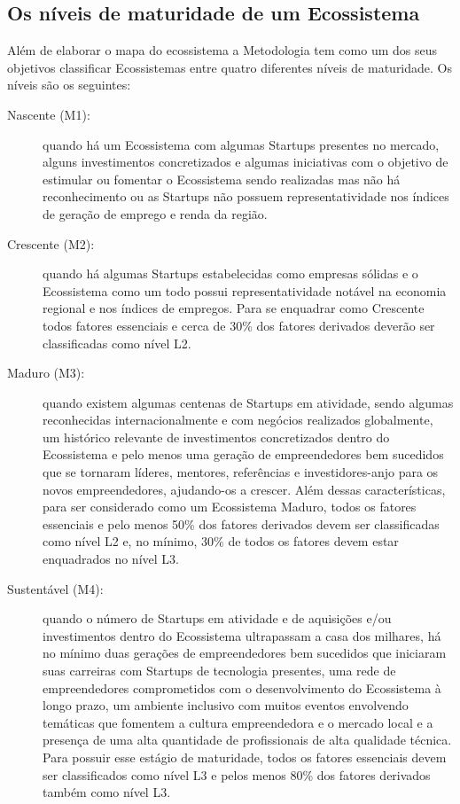 \subsection{Os níveis de maturidade de um Ecossistema}
\label{subsection:niveis_de_maturidade_de_um_ecossistema}

Além de elaborar o mapa do ecossistema a Metodologia tem como um dos seus objetivos classificar Ecossistemas entre quatro diferentes níveis de maturidade. Os níveis são os seguintes:

\begin{description}
  \item [Nascente (M1):] quando há um Ecossistema com algumas Startups presentes no mercado, alguns investimentos concretizados e algumas iniciativas com o objetivo de estimular ou fomentar o Ecossistema sendo realizadas mas não há reconhecimento ou as Startups não possuem representatividade nos índices de geração de emprego e renda da região.

  \item [Crescente (M2):] quando há algumas Startups estabelecidas como empresas sólidas e o Ecossistema como um todo possui representatividade notável na economia regional e nos índices de empregos. Para se enquadrar como Crescente todos fatores essenciais e cerca de 30\% dos fatores derivados deverão ser classificadas como nível L2.

  \item [Maduro (M3):] quando existem algumas centenas de Startups em atividade, sendo algumas reconhecidas internacionalmente e com negócios realizados globalmente, um histórico relevante de investimentos concretizados dentro do Ecossistema e pelo menos uma geração de empreendedores bem sucedidos que se tornaram líderes, mentores, referências e investidores-anjo para os novos empreendedores, ajudando-os a crescer. Além dessas características, para ser considerado como um Ecossistema Maduro, todos os fatores essenciais e pelo menos 50\% dos fatores derivados devem ser classificadas como nível L2 e, no mínimo, 30\% de todos os fatores devem estar enquadrados no nível L3.

  \item [Sustentável (M4):] quando o número de Startups em atividade e de aquisições e/ou investimentos dentro do Ecossistema ultrapassam a casa dos milhares, há no mínimo duas gerações de empreendedores bem sucedidos que iniciaram suas carreiras com Startups de tecnologia presentes, uma rede de empreendedores comprometidos com o desenvolvimento do Ecossistema à longo prazo, um ambiente inclusivo com muitos eventos envolvendo temáticas que fomentem a cultura empreendedora e o mercado local e a presença de uma alta quantidade de profissionais de alta qualidade técnica. Para possuir esse estágio de maturidade, todos os fatores essenciais devem ser classificados como nível L3 e pelos menos 80\% dos fatores derivados também como nível L3.
\end{description}

